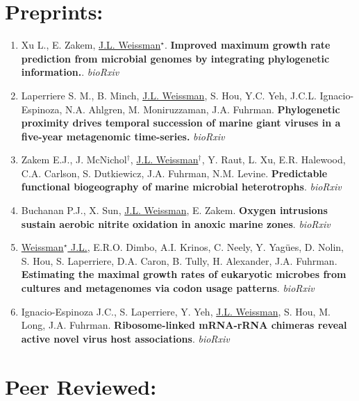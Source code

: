 \documentclass[]{res}
\begin{document}
\begin{resume}
 
 \section{Preprints:} \vspace{0mm}
  
 \begin{enumerate}[leftmargin=*]
 \setlength\itemsep{0.25em}
 
\item Xu L., E. Zakem, \underline{J.L. Weissman$^\star$}. {\bf Improved maximum growth rate prediction from microbial genomes by integrating phylogenetic information.}. \emph{bioRxiv}
 
\item Laperriere S. M., B. Minch, \underline{J.L. Weissman}, S. Hou, Y.C. Yeh, J.C.L. Ignacio-Espinoza, N.A. Ahlgren, M. Moniruzzaman, J.A. Fuhrman. {\bf Phylogenetic proximity drives temporal succession of marine giant viruses in a five-year metagenomic time-series.} \emph{bioRxiv}

\item Zakem E.J., J. McNichol$^\dagger$, \underline{J.L. Weissman}$^\dagger$, Y. Raut, L. Xu, E.R. Halewood, C.A. Carlson, S. Dutkiewicz, J.A. Fuhrman, N.M. Levine. {\bf Predictable functional biogeography of marine microbial heterotrophs}. \emph{bioRxiv}

\item Buchanan P.J., X. Sun, \underline{J.L. Weissman}, E. Zakem. {\bf Oxygen intrusions sustain aerobic nitrite 
oxidation in anoxic marine zones}. \emph{bioRxiv}

\item \underline{Weissman$^\star$ J.L.}, E.R.O. Dimbo, A.I. Krinos, C. Neely, Y. Yag\"{ues}, D. Nolin, S. Hou, S. Laperriere, D.A. Caron, B. Tully, H. Alexander, J.A. Fuhrman. {\bf Estimating the maximal growth rates of eukaryotic microbes from cultures and metagenomes via codon usage patterns}. \emph{bioRxiv}

\item Ignacio-Espinoza J.C., S. Laperriere, Y. Yeh, \underline{J.L. Weissman}, S. Hou, M. Long, J.A. Fuhrman. {\bf Ribosome-linked mRNA-rRNA chimeras reveal active novel virus host associations}. \emph{bioRxiv}
 

  \end{enumerate} 

  
 \section{Peer Reviewed:} \vspace{0mm}
 

\end{resume}
\end{document}
